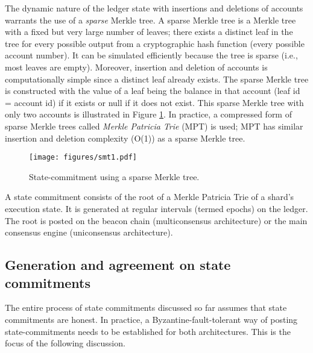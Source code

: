 \documentclass{article}
\begin{document}
The dynamic nature of the ledger state with insertions and deletions of accounts warrants the use of a {\em sparse} Merkle tree. A sparse Merkle tree is a Merkle tree with a fixed but very large number of leaves; there exists a distinct leaf in the tree  
for every possible output from a cryptographic hash function (every possible account number). It can be simulated efficiently because the tree is sparse (i.e., most leaves are empty). Moreover, insertion and deletion of accounts is computationally simple since a distinct leaf already exists. The sparse Merkle tree is constructed with the value of a leaf being the balance in that account (leaf id = account id) if it exists or null if it does not exist. This sparse Merkle tree with  only two accounts  is illustrated in Figure \ref{fig:sparseMT}. In practice, a compressed form of sparse Merkle trees called {\em Merkle Patricia Trie} (MPT) is used;  MPT has similar insertion and deletion complexity (O(1)) as a sparse Merkle tree. 

\begin{figure}
     \centering
     \texttt{[image: figures/smt1.pdf]}
   \caption{State-commitment using a sparse Merkle tree.}
   \label{fig:sparseMT}
\end{figure}

A state commitment consists of the root of a Merkle Patricia Trie of a shard’s execution state. It is generated at regular intervals (termed epochs) on the ledger. The root is posted on the beacon chain (multiconsensus  architecture) or the main consensus engine (uniconsensus architecture).  

\subsection{Generation and agreement on state commitments}
The entire process of state commitments discussed so far assumes that state commitments are honest. In practice, a Byzantine-fault-tolerant way of posting state-commitments needs to be established for both architectures. This is the focus of the following discussion. 
\end{document}
